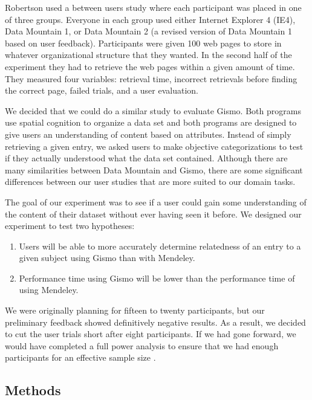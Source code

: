 \documentclass{article}
\begin{document}
Robertson used a between users study where each participant was placed in one of three groups.  Everyone in each group used either Internet Explorer 4 (IE4), Data Mountain 1, or Data Mountain 2 (a revised version of Data Mountain 1 based on user feedback).  Participants were given 100 web pages to store in whatever organizational structure that they wanted.  In the second half of the experiment they had to retrieve the web pages within a given amount of time.  They measured four variables: retrieval time, incorrect retrievals before finding the correct page, failed trials, and a user evaluation.  

We decided that we could do a similar study to evaluate Gismo.  Both programs use spatial cognition to organize a data set and both programs are designed to give users an understanding of content based on attributes.  Instead of simply retrieving a given entry, we asked users to make objective categorizations to test if they actually understood what the data set contained.  Although there are many similarities between Data Mountain and Gismo, there are some significant differences between our user studies that are more suited to our domain tasks.   

The goal of our experiment was to see if a user could gain some understanding of the content of their dataset without ever having seen it before.  We designed our experiment to test two hypotheses:  

\begin{enumerate}
\item{Users will be able to more accurately determine relatedness of an entry to a given subject using Gismo than with Mendeley.}
\item{Performance time using Gismo will be lower than the performance time of using Mendeley.}
\end{enumerate}

	We were originally planning for fifteen to twenty participants, but our preliminary feedback showed definitively negative results.  As a result, we decided to cut the user trials short after eight participants.  If we had gone forward, we would have completed a full power analysis to ensure that we had enough participants for an effective sample size \cite{Lenth2001}.  
	





\subsection{Methods}
\end{document}
